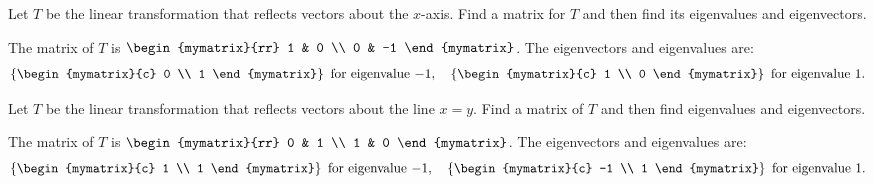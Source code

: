 \begin{ex}
  Let $T$ be the linear transformation that reflects vectors about
  the $x$-axis. Find a matrix for $T$ and then find its eigenvalues and
  eigenvectors.
  \begin{sol}
    The matrix of $T$ is $\begin{mymatrix}{rr}
      1 & 0 \\
      0 & -1
    \end{mymatrix}$. The eigenvectors and eigenvalues are:
    \begin{equation*}
      \set{\begin{mymatrix}{c}
          0 \\
          1
        \end{mymatrix} } ~\mbox{for eigenvalue}~ {-1},
      \quad\set{\begin{mymatrix}{c}
          1 \\
          0
        \end{mymatrix} } ~\mbox{for eigenvalue}~ {1}.
    \end{equation*}
  \end{sol}
\end{ex}

\begin{ex}
  Let $T$ be the linear transformation that reflects vectors about the
  line $x=y$. Find a matrix of $T$ and then find eigenvalues and
  eigenvectors.
  \begin{sol}
    The matrix of $T$ is $\begin{mymatrix}{rr}
      0 & 1 \\
      1 & 0
    \end{mymatrix}$. The eigenvectors and eigenvalues are:
    \begin{equation*}
      \set{\begin{mymatrix}{c}
          1 \\
          1
        \end{mymatrix} } ~\mbox{for eigenvalue}~ {-1},
      \quad\set{\begin{mymatrix}{c}
          -1 \\
          1
        \end{mymatrix} } ~\mbox{for eigenvalue}~ {1}.
    \end{equation*}
  \end{sol}
\end{ex}

